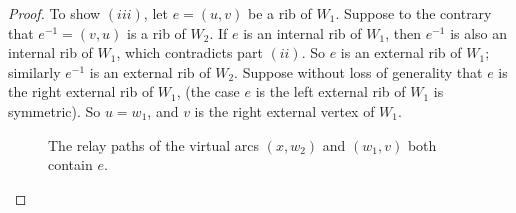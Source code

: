 \documentclass[12pt,letterpaper,oneside]{book}
\begin{document}
\begin{proof}
To show $(iii)$, let $e=(u,v)$ be a rib of $W_1$.  Suppose to the contrary that $e^{-1}=(v,u)$ is a rib of $W_2$.  If 
$e$ is an internal rib of $W_1$, then $e^{-1}$ is also an internal rib of $W_1$, which contradicts part $(ii)$.  
So $e$ is an external rib of $W_1$; similarly $e^{-1}$ is an external rib of $W_2$.  
Suppose without loss of generality that 
$e$ is the right external rib of $W_1$, (the case $e$ is the left external rib of $W_1$ is symmetric).  So $u=w_1$, and $v$ is the 
right external vertex of $W_1$.  

\begin{figure}[htp] 
\centering 
{} 
\caption[An edge in two relay paths]{The relay paths of the virtual arcs $(x,w_2)$ and $(w_1,v)$ both contain $e$.   \label{fig:fbw}} 
\end{figure} 



\end{proof}
\end{document}
